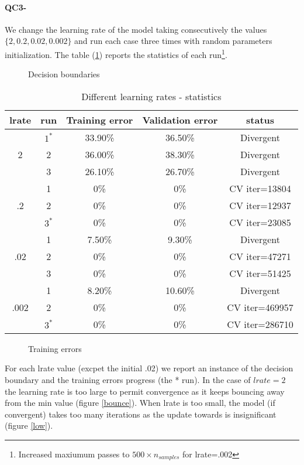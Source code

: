 \documentclass[11pt]{article}
\newcommand{\1}{\mathbbm{1}}
\newcommand{\0}{\mathbf{0}}
\begin{document}
	\paragraph{QC3-}
		We change the learning rate of the model taking consecutively the values $\{2, 0.2, 0.02, 0.002\}$ and run each case three times with random parameters initialization. The table (\ref{sttl}) reports the statistics of each run\footnote{Increased maxiumum passes to $500\times n_{samples}$ for lrate=.002}.
		\begin{figure}[H]
			\centering
			\caption{Decision boundaries}
		\end{figure}
		\begin{table}[H]
			\centering
			\begin{tabular}{|c|c|c|c|c|}
			\hline
			lrate & run & Training error & Validation error & status\\
			\hline
			\multirow{3}{*}{2} &$1^*$& 33.90\% & 36.50\% & Divergent\\
							   &2& 36.00\% & 38.30\% & Divergent\\
							   &3& 26.10\% & 26.70\% & Divergent\\
			\hline
			\multirow{3}{*}{.2} &1&  0\% & 0\% & CV iter=13804\\
							    &2&  0\% & 0\% & CV iter=12937\\
							    &$3^*$&  0\% & 0\% & CV iter=23085\\
			\hline
			\multirow{3}{*}{.02} &1& 7.50\% & 9.30\% & Divergent\\ 
							     &2& 0\% & 0\% & CV iter=47271\\
							     &3& 0\% & 0\% & CV iter=51425\\
			\hline
			\multirow{3}{*}{.002} &1& 8.20\% & 10.60\% & Divergent\\ 
						          &2& 0\% & 0\% & CV iter=469957 \\
						          &$3^*$& 0\% & 0\% & CV iter=286710 \\
			\hline					     	
			\end{tabular}
			\caption{Different learning rates - statistics}\label{sttl}		    
		\end{table}
		\begin{figure}[H]
		\caption{Training errors}
			\centering
		\end{figure}
		For each lrate value (excpet the initial .02) we report an instance of the decision boundary and the training errors progress (the * run). In the case of $lrate=2$ the learning rate is too large to permit convergence as it keeps bouncing away from the min value (figure \ref{bounce}). When lrate is too small, the model (if convergent) takes too many iterations as the update towards is insignificant (figure \ref{low}).
\end{document}

